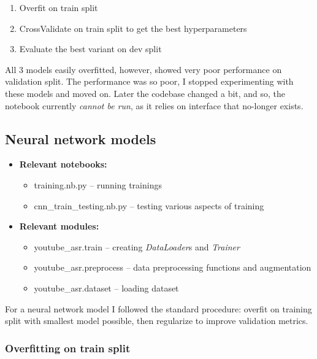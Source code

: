 \documentclass[11pt]{article}
\newcommand{\Fn}[1]{{\small\textit{#1}}}
\newcommand{\File}[1]{{\small\textsf{#1}}}
\begin{document}
\begin{enumerate}
  \item Overfit on train split
  \item CrossValidate on train split to get the best hyperparameters
  \item Evaluate the best variant on dev split
\end{enumerate}

All 3 models easily overfitted, however, showed very poor performance on
validation split. The performance was so poor, I stopped experimenting with
these models and moved on. Later the codebase changed a bit, and so, the
notebook currently \emph{cannot be run}, as it relies on interface that
no-longer exists.

\subsection{Neural network models}\label{section:nn_models}

\begin{itemize}
  \item[] \textbf{Relevant notebooks:}
    \begin{itemize}
      \item \File{training.nb.py} -- running trainings
      \item \File{cnn\_train\_testing.nb.py} -- testing various aspects of training
    \end{itemize}
  \item[] \textbf{Relevant modules:}
    \begin{itemize}
      \item \File{youtube\_asr.train} -- creating \Fn{DataLoader}s and \Fn{Trainer}
      \item \File{youtube\_asr.preprocess} -- data preprocessing functions and augmentation
      \item \File{youtube\_asr.dataset} -- loading dataset
    \end{itemize}
\end{itemize}

For a neural network model I followed the standard procedure: overfit on
training split with smallest model possible, then regularize to improve
validation metrics.

\subsubsection{Overfitting on train split}
\end{document}
